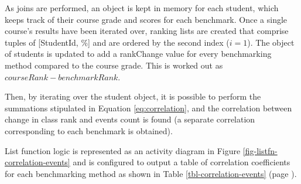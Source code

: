 As joins are performed, an object is kept in memory for each student, which keeps track of their course grade and scores for each benchmark. Once a single course’s results have been iterated over, ranking lists are created that comprise tuples of [StudentId, \%] and are ordered by the second index ($i = 1$). The object of students is updated to add a rankChange value for every benchmarking method compared to the course grade. This is worked out as $courseRank - benchmarkRank$.

Then, by iterating over the student object, it is possible to perform the summations stipulated in Equation \ref{eq:correlation}, and the correlation between change in class rank and events count is found (a separate correlation corresponding to each benchmark is obtained).

List function logic is represented as an activity diagram in Figure \ref{fig-listfn-correlation-events} and is configured to output a table of correlation coefficients for each benchmarking method as shown in Table \ref{tbl-correlation-events} (page \pageref{tbl-correlation-events}).

